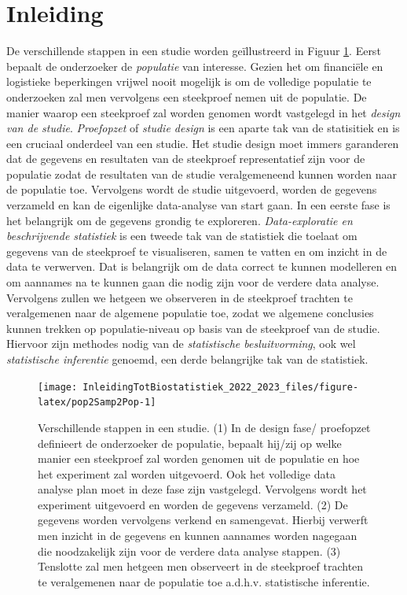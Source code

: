 \documentclass[
  12pt,dutch,coursenotes]{book}
\begin{document}
\hypertarget{inleiding-1}{%
\section{Inleiding}\label{inleiding-1}}

De verschillende stappen in een studie worden geïllustreerd in
Figuur \ref{fig:pop2Samp2Pop}.
Eerst bepaalt de onderzoeker de \emph{populatie} van interesse.
Gezien het om financiële en logistieke beperkingen vrijwel nooit mogelijk is om de volledige populatie te onderzoeken zal men vervolgens een steekproef nemen uit de populatie.
De manier waarop een steekproef zal worden genomen wordt vastgelegd in het \emph{design van de studie}.
\emph{Proefopzet} of \emph{studie design} is een aparte tak van de statisitiek en is een cruciaal onderdeel van een studie.
Het studie design moet immers garanderen dat de gegevens en resultaten van de steekproef representatief zijn voor de populatie zodat de resultaten van de studie veralgemeneend kunnen worden naar de populatie toe.
Vervolgens wordt de studie uitgevoerd, worden de gegevens verzameld en kan de eigenlijke data-analyse van start gaan.
In een eerste fase is het belangrijk om de gegevens grondig te exploreren.
\emph{Data-exploratie en beschrijvende statistiek} is een tweede tak van de statistiek die toelaat om gegevens van de steekproef te visualiseren, samen te vatten en om inzicht in de data te verwerven.
Dat is belangrijk om de data correct te kunnen modelleren en om aannames na te kunnen gaan die nodig zijn voor de verdere data analyse. Vervolgens zullen we hetgeen we observeren in de steekproef trachten te veralgemenen naar de algemene populatie toe, zodat we algemene conclusies kunnen trekken op populatie-niveau op basis van de steekproef van de studie. Hiervoor zijn methodes nodig van de \emph{statistische besluitvorming}, ook wel \emph{statistische inferentie} genoemd, een derde belangrijke tak van de statistiek.

\begin{figure}

{\centering \texttt{[image: InleidingTotBiostatistiek\_2022\_2023\_files/figure-latex/pop2Samp2Pop-1]} 

}

\caption{Verschillende stappen in een studie. (1) In de design fase/ proefopzet definieert de onderzoeker de populatie, bepaalt hij/zij op welke manier een steekproef zal worden genomen uit de populatie en hoe het experiment zal worden uitgevoerd. Ook het volledige data analyse plan moet in deze fase zijn vastgelegd. Vervolgens wordt het experiment uitgevoerd en worden de gegevens verzameld. (2) De gegevens worden vervolgens verkend en samengevat. Hierbij verwerft men inzicht in de gegevens en kunnen aannames worden nagegaan die noodzakelijk zijn voor de verdere data analyse stappen. (3) Tenslotte zal men hetgeen men observeert in de steekproef trachten te veralgemenen naar de populatie toe a.d.h.v. statistische inferentie.}\label{fig:pop2Samp2Pop}
\end{figure}
\end{document}
